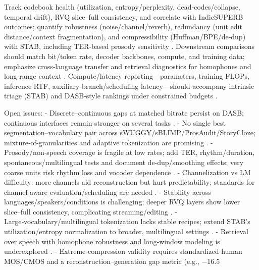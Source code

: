 \documentclass{article}
\begin{document}
Track codebook health (utilization, entropy/perplexity, dead‑codes/collapse, temporal drift), RVQ slice–full consistency, and correlate with IndicSUPERB outcomes; quantify robustness (noise/channel/reverb), redundancy (unit edit distance/context fragmentation), and compressibility (Huffman/BPE/de‑dup) with STAB, including TER‑based prosody sensitivity \cite{vashishth2024stabspeechtokenizerassessmentbenchmark,entry2025indicsuperbspeechprocessinguniversalperf,onda2025benchmarkingprosodyencodingdiscretespeec}. Downstream comparisons should match bit/token rate, decoder backbones, compute, and training data; emphasize cross‑language transfer and retrieval diagnostics for homophones and long‑range context \cite{har-tuv2025pastphoneticacousticspeechtokenizer,min2025speechretrievalaugmentedgenerationwithou,entry2025indicsuperbspeechprocessinguniversalperf}. Compute/latency reporting—parameters, training FLOPs, inference RTF, auxiliary‑branch/scheduling latency—should accompany intrinsic triage (STAB) and DASB‑style rankings under constrained budgets \cite{maimon2025scalinganalysisinterleavedspeechtextlang,mousavi2024dasbdiscreteaudiospeechbenchmark,vashishth2024stabspeechtokenizerassessmentbenchmark,maimon2025salmonsuiteacousticlanguagemodelevaluati,chen2023reducingbarriersselfsupervisedlearninghu}.

Open issues:
- Discrete–continuous gaps at matched bitrate persist on DASB; continuous interfaces remain stronger on several tasks \cite{mousavi2024dasbdiscreteaudiospeechbenchmark}.
- No single best segmentation–vocabulary pair across sWUGGY/sBLIMP/ProsAudit/StoryCloze; mixture‑of‑granularities and adaptive tokenization are promising \cite{kando2025exploringeffectsegmentationvocabularysiz}.
- Prosody/non‑speech coverage is fragile at low rates; add TER, rhythm/duration, spontaneous/multilingual tests and document de‑dup/smoothing effects; very coarse units risk rhythm loss and vocoder dependence \cite{onda2025benchmarkingprosodyencodingdiscretespeec,baade2024syllablelmlearningcoarsesemanticunitsspe}.
- Channelization vs LM difficulty: more channels aid reconstruction but hurt predictability; standards for channel‑aware evaluation/scheduling are needed \cite{ji2025languagecodecbridgingdiscreterepresentat}.
- Stability across languages/speakers/conditions is challenging; deeper RVQ layers show lower slice–full consistency, complicating streaming/editing \cite{vashishth2024stabspeechtokenizerassessmentbenchmark,maimon2025salmonsuiteacousticlanguagemodelevaluati,cui2025voxevalbenchmarkingknowledgeunderstandin,entry2025indicsuperbspeechprocessinguniversalperf}.
- Large‑vocabulary/multilingual tokenization lacks stable recipes; extend STAB’s utilization/entropy normalization to broader, multilingual settings \cite{vashishth2024stabspeechtokenizerassessmentbenchmark}.
- Retrieval over speech with homophone robustness and long‑window modeling is underexplored \cite{min2025speechretrievalaugmentedgenerationwithou,onda2025benchmarkingprosodyencodingdiscretespeec,maimon2025salmonsuiteacousticlanguagemodelevaluati,entry2025indicsuperbspeechprocessinguniversalperf}.
- Extreme‑compression validity requires standardized human MOS/CMOS and a reconstruction–generation gap metric (e.g., −16.5%
\end{document}
